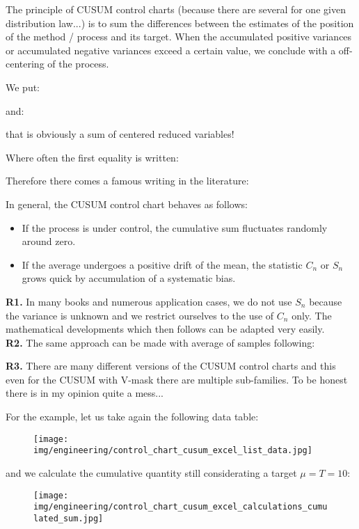 	The principle of CUSUM control charts (because there are several for one given distribution law...) is to sum the differences between the estimates of the position of the method / process and its target. When the accumulated positive variances or accumulated negative variances exceed a certain value, we conclude with a off-centering of the process.
	
	We put:
	
	and:
	
	that is obviously a sum of centered reduced variables!
	
	Where often the first equality is written:
	
	Therefore there comes a famous writing in the literature:
	
	In general, the CUSUM control chart behaves as follows:
	\begin{itemize}
		\item If the process is under control, the cumulative sum fluctuates randomly around zero.

		\item If the average undergoes a positive drift of the mean, the statistic $C_n$ or $S_n$ grows quick by accumulation of a systematic bias.
	\end{itemize}
	\begin{tcolorbox}[title=Remarks,colframe=black,arc=10pt]
	\textbf{R1.} In many books and numerous application cases, we do not use $S_n$ because the variance is unknown and we restrict ourselves to the use of $C_n$ only. The mathematical developments which then follows can be adapted very easily.\\
	
	\textbf{R2.} The same approach can be made with average of samples following:
	
	
	\textbf{R3.} There are many different versions of the CUSUM control charts and this even for the CUSUM with V-mask there are multiple sub-families. To be honest there is in my opinion quite a mess...
	\end{tcolorbox}
	For the example, let us take again the following data table:
	\begin{figure}[H]
		\centering
		\texttt{[image: img/engineering/control\_chart\_cusum\_excel\_list\_data.jpg]}
	\end{figure}
	and we calculate the cumulative quantity still considerating a target $\mu=T=10$:
	\begin{figure}[H]
		\centering
		\texttt{[image: img/engineering/control\_chart\_cusum\_excel\_calculations\_cumulated\_sum.jpg]}
	\end{figure}
